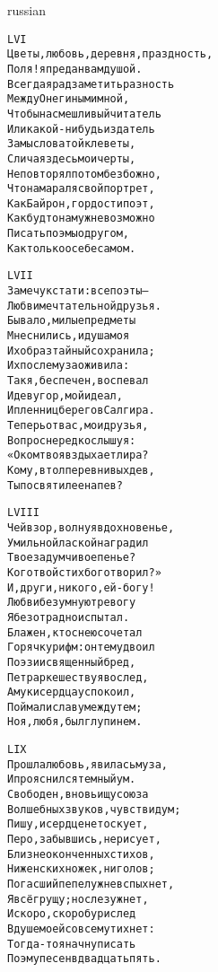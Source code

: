 \documentclass[12pt,twocolumn]{article}
\begin{document}
\begin{center}
\begin{otherlanguage*}{russian}
\begin{minipage}[t]{\dimexpr 0.5\textwidth -\tabcolsep-.5pt}
\begin{alltt}\normalfont\centering
LVI
Цветы, любовь, деревня, праздность,
Поля! я предан вам душой.
Всегда я рад заметить разность
Между Онегиным и мной,
Чтобы насмешливый читатель
Или какой-нибудь издатель
Замысловатой клеветы,
Сличая здесь мои черты,
Не повторял потом безбожно,
Что намарал я свой портрет,
Как Байрон, гордости поэт,
Как будто нам уж невозможно
Писать поэмы о другом,
Как только о себе самом.
\end{alltt}
\end{minipage}
\clearpage

\begin{minipage}[t]{\dimexpr 0.5\textwidth -\tabcolsep-.5pt}
\begin{alltt}\normalfont\centering
LVII
Замечу кстати: все поэты —
Любви мечтательной друзья.
Бывало, милые предметы
Мне снились, и душа моя
Их образ тайный сохранила;
Их после муза оживила:
Так я, беспечен, воспевал
И деву гор, мой идеал,
И пленниц берегов Салгира.
Теперь от вас, мои друзья,
Вопрос нередко слышу я:
«О ком твоя вздыхает лира?
Кому, в толпе ревнивых дев,
Ты посвятил ее напев?
\end{alltt}
\end{minipage}

\begin{minipage}[t]{\dimexpr 0.5\textwidth -\tabcolsep-.5pt}
\begin{alltt}\normalfont\centering
LVIII
Чей взор, волнуя вдохновенье,
Умильной лаской наградил
Твое задумчивое пенье?
Кого твой стих боготворил?»
И, други, никого, ей-богу!
Любви безумную тревогу
Я безотрадно испытал.
Блажен, кто с нею сочетал
Горячку рифм: он тем удвоил
Поэзии священный бред,
Петрарке шествуя вослед,
А муки сердца успокоил,
Поймал и славу между тем;
Но я, любя, был глуп и нем.
\end{alltt}
\end{minipage}
\clearpage

\begin{minipage}[t]{\dimexpr 0.5\textwidth -\tabcolsep-.5pt}
\begin{alltt}\normalfont\centering
LIX
Прошла любовь, явилась муза,
И прояснился темный ум.
Свободен, вновь ищу союза
Волшебных звуков, чувств и дум;
Пишу, и сердце не тоскует,
Перо, забывшись, не рисует,
Близ неоконченных стихов,
Ни женских ножек, ни голов;
Погасший пепел уж не вспыхнет,
Я всё грущу; но слез уж нет,
И скоро, скоро бури след
В душе моей совсем утихнет:
Тогда-то я начну писать
Поэму песен в двадцать пять.
\end{alltt}
\end{minipage}


\end{otherlanguage*}
\end{center}
\end{document}
